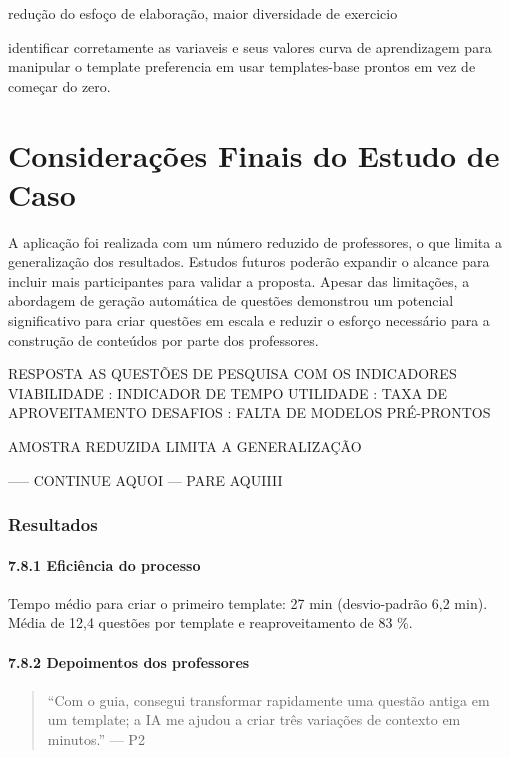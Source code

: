 redução do esfoço de elaboração, maior diversidade de exercicio

identificar corretamente as variaveis e seus valores
curva de aprendizagem para manipular o template
preferencia em usar templates-base prontos em vez de começar do zero.

\section{Considerações Finais do Estudo de Caso}
A aplicação foi realizada com um número reduzido de professores, o que limita a generalização dos resultados. Estudos futuros poderão expandir o alcance para incluir mais participantes para validar a proposta. Apesar das limitações, a abordagem de geração automática de questões demonstrou um potencial significativo para criar questões em escala e reduzir o esforço necessário para a construção de conteúdos por parte dos professores.


RESPOSTA AS QUESTÕES DE PESQUISA COM OS INDICADORES 
VIABILIDADE : INDICADOR DE TEMPO
UTILIDADE : TAXA DE APROVEITAMENTO 
DESAFIOS : FALTA DE MODELOS PRÉ-PRONTOS

AMOSTRA REDUZIDA LIMITA A GENERALIZAÇÃO

----- CONTINUE AQUOI ---  PARE AQUIIII


\subsubsection{\textbf{Resultados}}

\paragraph{\textbf{7.8.1 Eficiência do processo}}

Tempo médio para criar o primeiro template: 27 min (desvio-padrão 6,2 min). Média de 12,4 questões por template e reaproveitamento de 83 \%.

\paragraph{\textbf{7.8.2 Depoimentos dos professores}}

\begin{quote}
“Com o guia, consegui transformar rapidamente uma questão antiga em um template; a IA me ajudou a criar três variações de contexto em minutos.” — P2

\end{quote}


